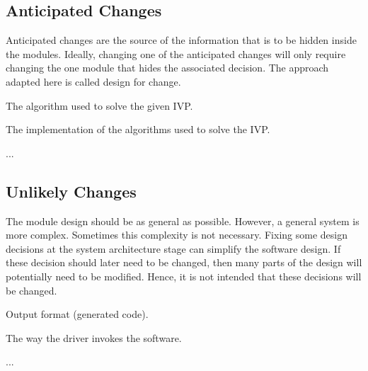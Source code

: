 \documentclass[12pt, titlepage]{article}
\newcounter{acnum}
\newcommand{\actheacnum}{AC\theacnum}
\newcounter{ucnum}
\newcommand{\uctheucnum}{UC\theucnum}
\begin{document}

\subsection{Anticipated Changes} \label{SecAchange}

Anticipated changes are the source of the information that is to be hidden
inside the modules. Ideally, changing one of the anticipated changes will only
require changing the one module that hides the associated decision. The approach
adapted here is called design for
change.

\begin{description}
\item[ \actheacnum \label{acAlgorithm}:] The algorithm 
used to solve the given IVP.
\item[ \actheacnum \label{acImplementation}:] The 
implementation of the algorithms used to solve the IVP.
\item ...
\end{description}

\subsection{Unlikely Changes} \label{SecUchange}

The module design should be as general as possible. However, a general system is
more complex. Sometimes this complexity is not necessary. Fixing some design
decisions at the system architecture stage can simplify the software design. If
these decision should later need to be changed, then many parts of the design
will potentially need to be modified. Hence, it is not intended that these
decisions will be changed.

\begin{description}
\item[ \uctheucnum \label{ucOutput}:] Output format 
(generated code).
\item[ \uctheucnum \label{ucInput}:] The way the driver 
invokes the software.
\item ...
\end{description}
\end{document}
